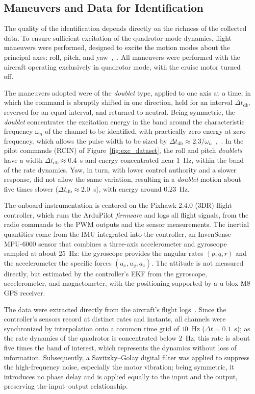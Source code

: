\documentclass{ieeeaccess}
\begin{document}
\subsection{Maneuvers and Data for Identification}

The quality of the identification depends directly on the richness of the collected data. To ensure sufficient excitation of the quadrotor-mode dynamics, flight maneuvers were performed, designed to excite the motion modes about the principal axes: roll, pitch, and yaw~\cite{c7},~\cite{c8}. All maneuvers were performed with the aircraft operating exclusively in quadrotor mode, with the cruise motor turned off.

The maneuvers adopted were of the \textit{doublet} type, applied to one axis at a time, in which the command is abruptly shifted in one direction, held for an interval $\Delta t_{\text{db}}$, reversed for an equal interval, and returned to neutral. Being symmetric, the \textit{doublet} concentrates the excitation energy in the band around the characteristic frequency $\omega_n$ of the channel to be identified, with practically zero energy at zero frequency, which allows the pulse width to be sized by $\Delta t_{\text{db}} \approx 2.3/\omega_n$~\cite{c2},~\cite{c3}. In the pilot commands (RCIN) of Figure~\ref{fig:exc_dataset}, the roll and pitch \textit{doublets} have a width $\Delta t_{\text{db}} \approx 0.4$~s and energy concentrated near $1$~Hz, within the band of the rate dynamics. Yaw, in turn, with lower control authority and a slower response, did not allow the same variation, resulting in a \textit{doublet} motion about five times slower ($\Delta t_{\text{db}} \approx 2.0$~s), with energy around $0.23$~Hz.

The onboard instrumentation is centered on the Pixhawk 2.4.0 (3DR) flight controller, which runs the ArduPilot \textit{firmware} and logs all flight signals, from the radio commands to the PWM outputs and the sensor measurements. The inertial quantities come from the IMU integrated into the controller, an InvenSense MPU-6000 sensor that combines a three-axis accelerometer and gyroscope sampled at about $25$~Hz: the gyroscope provides the angular rates $(p, q, r)$ and the accelerometer the specific forces $(a_x, a_y, a_z)$. The attitude is not measured directly, but estimated by the controller's EKF from the gyroscope, accelerometer, and magnetometer, with the positioning supported by a u-blox M8 GPS receiver.

The data were extracted directly from the aircraft's flight logs~\cite{c9}. Since the controller's sensors record at distinct rates and instants, all channels were synchronized by interpolation onto a common time grid of $10$~Hz ($\Delta t = 0.1$~s); as the rate dynamics of the quadrotor is concentrated below $2$~Hz, this rate is about five times the band of interest, which represents the dynamics without loss of information. Subsequently, a Savitzky--Golay digital filter was applied to suppress the high-frequency noise, especially the motor vibration; being symmetric, it introduces no phase delay and is applied equally to the input and the output, preserving the input--output relationship.
\end{document}

